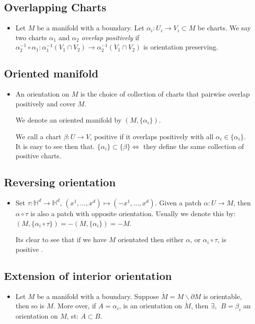 \documentclass[11pt]{article}
\numberwithin{equation}{section}
\begin{document}
\subsection{Overlapping Charts}
\begin{itemize}
    \item Let $M$ be a manifold with a boundary. Let $\alpha_i:U_i \rightarrow V_i \subset M$ be charts. We say two charts $\alpha_1$ and $\alpha_2$ \emph{overlap positively} if $\alpha_2^{-1} \circ \alpha_1: \alpha_1^{-1}(V_1 \cap V_2)\rightarrow \alpha_2^{-1}(V_1 \cap V_2)$ is orientation preserving. 
\end{itemize}


\subsection{Oriented manifold}
\begin{itemize}
    \item An orientation on $M$ is the choice of collection of charts that pairwise overlap positively and cover $M$. 

We denote an oriented manifold by $(M,\{\alpha_i\})$. 

We call a chart $\beta:U \rightarrow V$, positive if it overlaps positively with all $\alpha_i \in \{\alpha_i\}$.  It is easy to see then that. $\{\alpha_i\}\subset \{\beta\} \iff$ they define the same collection of positive charts. 
\end{itemize}

\subsection{Reversing orientation}
\begin{itemize}
    \item Set $\tau:\mathbb{H}^d\rightarrow \mathbb{H}^d$, $(x^1,...,x^d)\mapsto (-x^1,...,x^d)$. Given a patch $\alpha:U \rightarrow M$, then $\alpha \circ \tau$ is also a patch with opposite orientation. Usually we denote this by: $(M,\{\alpha_i\circ \tau\}) = -(M,\{\alpha_i\}) = -M$.  

Its clear to see that if we have $M$ orientated then either $\alpha$, or $\alpha_i\circ \tau$, is positive .
\end{itemize}

\subsection{Extension of interior orientation}
\begin{itemize}
    \item Let $M$ be a manifold with a boundary. Suppose $\mathring{M}= M\backslash \partial M$  is orientable, then so is $M$. More over, if $A={\alpha_i}$, is an orientation on $\mathring{M}$, then $\exists,~~B={\beta_i}$ an orientation on $M$, st: $A \subset B$.   
\end{itemize}
\end{document}

